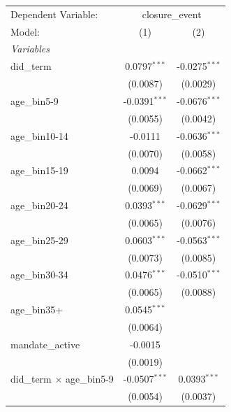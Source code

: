 
\begingroup
\centering
\begin{tabular}{lcc}
   \tabularnewline \midrule \midrule
   Dependent Variable: & \multicolumn{2}{c}{closure\_event}\\
   Model:                              & (1)             & (2)\\  
   \midrule
   \emph{Variables}\\
   did\_term                           & 0.0797$^{***}$  & -0.0275$^{***}$\\   
                                       & (0.0087)        & (0.0029)\\   
   age\_bin5-9                         & -0.0391$^{***}$ & -0.0676$^{***}$\\   
                                       & (0.0055)        & (0.0042)\\   
   age\_bin10-14                       & -0.0111         & -0.0636$^{***}$\\   
                                       & (0.0070)        & (0.0058)\\   
   age\_bin15-19                       & 0.0094          & -0.0662$^{***}$\\   
                                       & (0.0069)        & (0.0067)\\   
   age\_bin20-24                       & 0.0393$^{***}$  & -0.0629$^{***}$\\   
                                       & (0.0065)        & (0.0076)\\   
   age\_bin25-29                       & 0.0603$^{***}$  & -0.0563$^{***}$\\   
                                       & (0.0073)        & (0.0085)\\   
   age\_bin30-34                       & 0.0476$^{***}$  & -0.0510$^{***}$\\   
                                       & (0.0065)        & (0.0088)\\   
   age\_bin35+                         & 0.0545$^{***}$  &   \\   
                                       & (0.0064)        &   \\   
   mandate\_active                     & -0.0015         &   \\   
                                       & (0.0019)        &   \\   
   did\_term $\times$ age\_bin5-9      & -0.0507$^{***}$ & 0.0393$^{***}$\\   
                                       & (0.0054)        & (0.0037)\\   

\end{tabular}

